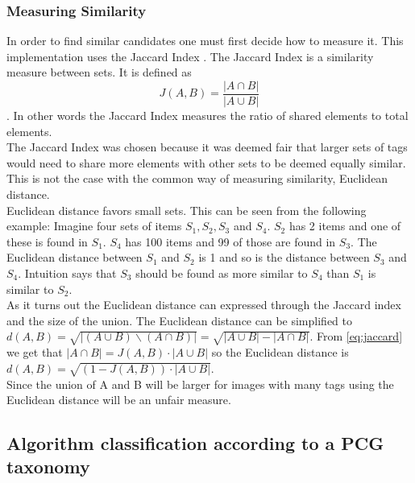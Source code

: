 \documentclass[]{article}
\begin{document}
\subsubsection{Measuring Similarity}
\label{sec:sim}
In order to find similar candidates one must first decide how to measure it. This implementation uses the Jaccard Index \cite{jaccard1912distribution}. The Jaccard Index is a similarity measure between sets. It is defined as
\begin{equation}
\label{eq:jaccard}
J(A,B) = \frac{|A \cap B|}{|A \cup B|}
\end{equation}
. In other words the Jaccard Index measures the ratio of shared elements to total elements.\\
The Jaccard Index was chosen because it was deemed fair that larger sets of tags would need to share more elements with other sets to be deemed equally similar. This is not the case with the common way of measuring similarity, Euclidean distance.\\
Euclidean distance favors small sets. This can be seen from the following example: Imagine four sets of items $S_1, S_2, S_3$ and $S_4$. $S_2$ has 2 items and one of these is found in $S_1$. $S_4$ has 100 items and 99 of those are found in $S_3$. The Euclidean distance between $S_1$ and $S_2$ is 1 and so is the distance between $S_3$ and $S_4$. Intuition says that $S_3$ should be found as more similar to $S_4$ than $S_1$ is similar to $S_2$.\\
As it turns out the Euclidean distance can expressed through the Jaccard index and the size of the union. The Euclidean distance can be simplified to $d(A,B) = \sqrt{|(A \cup B) \backslash (A \cap B)|} = \sqrt{|A \cup B| - |A \cap B|}$. From \autoref{eq:jaccard} we get that $|A \cap B| = J(A,B) \cdot |A \cup B|$ so the Euclidean distance is $d(A,B) = \sqrt{(1 - J(A,B)) \cdot |A \cup B|}$.\\
Since the union of A and B will be larger for images with many tags using the Euclidean distance will be an unfair measure.


\subsection{Algorithm classification according to a PCG taxonomy}
\end{document}
